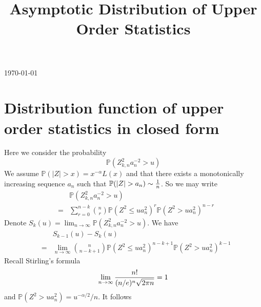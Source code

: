 \documentclass[11pt,reqno]{amsart}
\renewcommand{\P}{\mathbb{P}}
\newcommand{\1}{\mathds{1}}
\newcommand{\0}{\boldsymbol{0}}
\newcommand{\floor}[1]{\lfloor #1 \rfloor}
\newcommand{\4}{\mathchoice{\mskip1.5mu}{\mskip1.5mu}{}{}}
\newcommand{\5}{\mathchoice{\mskip-1.5mu}{\mskip-1.5mu}{}{}}
\newcommand{\2}{\penalty250\mskip\thickmuskip\mskip-\thinmuskip} %
\begin{document}
\today

\title{Asymptotic Distribution of Upper Order Statistics}

\begin{abstract}

\end{abstract}

\maketitle

\section{Distribution function of upper order statistics in closed form}
\setcounter{equation}{0}
Here we consider the probability
\[
\P(Z_{k, n}^2 a_n^{-2} > u)
\]
We assume $\P(|Z| > x) = x^{-\alpha} L(x)$ and that there exists a
monotonically increasing sequence $a_n$ such that $\P(|Z| >
a_n) \sim {1 \over n}$. So we may write
\begin{eqnarray}
  && \P(Z_{k, n}^2 a_n^{-2} > u) \nonumber\\
  &=& \sum_{r=0}^{n-k} {n \choose r} \P(Z^2 \leq ua_n^2)^r \P(Z^2 >
  u a_n^2)^{n-r} \label{eq:A1}
\end{eqnarray}
Denote $S_k(u) = \lim_{n \to \infty}\P(Z_{k, n}^2 a_n^{-2} > u)$. We have
\begin{eqnarray*}
  && S_{k-1}(u) - S_k(u) \\
  &=& \lim_{n \to \infty}{n \choose n-k+1} \P(Z^2 \leq ua_n^2)^{n-k+1} \P(Z^2 > ua_n^2)^{k-1}
\end{eqnarray*}
Recall Stirling's formula
\[
\lim_{n \to \infty} {n! \over (n/e)^n \sqrt{2\pi n}} = 1
\]
and $\P(Z^2 > ua_n^2) = u^{-\alpha/2}/n$. It follows
\end{document}
